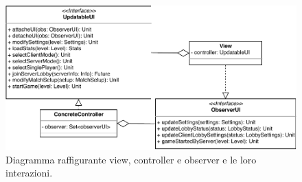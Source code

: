 \begin{figure}[H]
	\centering
	\includegraphics[width=\columnwidth]{drawio/view-controller-observer/view-controller-observer.pdf}
	\caption{Diagramma raffigurante view, controller e observer e le loro interazioni.}
	\label{fig:view-controller-observer}
\end{figure}